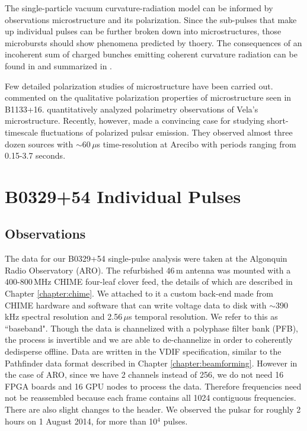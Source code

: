 The single-particle vacuum curvature-radiation model 
can be informed by observations microstructure and 
its polarization. Since the sub-pulses that make 
up individual pulses can be further broken down into 
microstructures, those microbursts should show phenomena 
predicted by thoery. The consequences of 
an incoherent sum of charged bunches 
emitting coherent curvature radiation can be found 
in \citet{1990A&A...234..269G} and summarized 
in \citet{2015ApJ...806..236M}.

Few detailed polarization studies of 
microstructure have been carried out. 
\citet{1978A&A....64...27F} commented on the qualitative 
polarization properties of microstructure seen in B1133+16. 
\citet{2002MNRAS.334..523K} quantitatively analyzed polarimetry 
observations of Vela's microstructure. Recently, however, 
\citet{2015ApJ...806..236M} made a convincing case for 
studying short-timescale 
fluctuations of polarized pulsar emission. 
They observed almost three 
dozen sources with $\sim$60\,$\mu$s time-resolution at 
Arecibo with periods ranging from 0.15-3.7 seconds.




\section{B0329+54 Individual Pulses}

\subsection{Observations}

The data for our B0329+54 single-pulse analysis 
were taken at the Algonquin Radio Observatory (ARO). 
The refurbished 46\,m antenna was mounted with a 400-800\,MHz 
CHIME four-leaf clover feed, the details 
of which are described in Chapter \ref{chapter:chime}. 
We attached to it a custom back-end 
made from CHIME hardware and software that can write voltage 
data to disk with $\sim$390\,kHz spectral resolution 
and 2.56\,$\mu$s temporal resolution. We refer to this as ``baseband". 
Though the data is channelized with a polyphase filter bank (PFB),
the process is invertible and we are able to 
de-channelize in order to coherently dedisperse offline. Data are written 
in the VDIF specification, similar to the Pathfinder data format 
described in Chapter \ref{chapter:beamforming}. However in 
the case of ARO, since we have 2 channels instead of 256, we do 
not need 16 FPGA boards and 16 GPU nodes to process the data. 
Therefore frequencies need not be reassembled because 
each frame contains all 1024 contiguous frequencies. There 
are also slight changes to the header. 
We observed the pulsar for roughly 2 hours on 1 August 
2014, for more than 10$^4$ pulses. 


